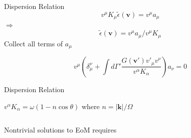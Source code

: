 \documentclass[9pt]{beamer}
\begin{document}
\begin{darkframes}
\begin{frame}{Dispersion Relation}
\begin{equation*}
    v^\mu K_\mu \tilde \epsilon (\boldsymbol{v}) = v^\mu a_\mu
\end{equation*}
\pause
{\centering
$\Longrightarrow$
\begin{equation*}
    \tilde \epsilon (\boldsymbol{v}) = v^\mu a_\mu/v^\mu K_\mu
\end{equation*}
}
Collect all terms of $a_\mu$

\begin{equation*}
    v^\mu \left( \delta_\mu^\nu +  \int d\Gamma' \frac{ G(\boldsymbol{ v}') v'_\mu v^\nu }{ v^\alpha K_\alpha }   \right) a_\nu = 0
\end{equation*}

\end{frame}


\begin{frame}{Dispersion Relation}


\begin{tcolorbox}[standard jigsaw, opacityback=0, coltext=white]
$v^\alpha K_\alpha = \omega (1 - n \cos \theta)$ where $n = \lvert \boldsymbol{k} \rvert / \Omega $
\end{tcolorbox}

\begin{columns}[T]
    \begin{column}{0.5\textwidth}
Nontrivial solutions to EoM requires



\end{column}
\end{columns}
\end{frame}
\end{darkframes}
\end{document}
